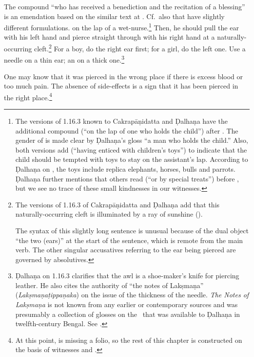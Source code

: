 \begin{translation}
{The compound  “who has received a benediction and
the recitation of a blessing” is an emendation based on the similar text at
.  Cf.\ also  that have slightly
different formulations.} on the lap of a wet-nurse.\footnote{The versions of
    1.16.3 known to Cakrapāṇidatta \citep[126]{acar-1939} and Ḍalhaṇa
    \citep[76]{vulgate} have the additional compound  (“on the
    lap of one who holds the child”) after . The gender of
     is made clear by  Ḍalhaṇa's gloss “a man who holds the child.”
    Also, both versions add  (“having enticed with
    children's toys”) to indicate that the child should be tempted with toys to stay
    on the assistant's lap. According to Ḍalhaṇa on , the toys include
    replica elephants, horses, bulls and parrots. Ḍalhaṇa further mentions that others
    read  (“or by special treats”) before
    , but we see no trace of these small kindnesses in our
    witnesses.} Then, he should pull the ear with his left hand 
    and pierce straight through with his right hand at a naturally-occurring
    cleft.\footnote{The versions of 1.16.3 of Cakrapāṇidatta \citep[126]{acar-1939}
        and Ḍalhaṇa \citep[76]{vulgate} add that this naturally-occurring cleft is
        illuminated by a ray of sunshine  ().

The syntax of this slightly long sentence is unusual because of the dual
object  “the two (ears)” at the start of the sentence, which is remote
from the main verb.  The other singular accusatives referring to the ear being
pierced are governed by absolutives.} For a boy, do the right ear first; for a
girl, do the left one. Use a needle on a thin ear; an  on a thick
one.\footnote{Ḍalhaṇa on 1.16.3 \citep[76]{vulgate} clarifies that the awl is a
    shoe-maker's knife for piercing leather.  He also cites the authority of “the
    notes of Lakṣmaṇa” (\emph{Lakṣmaṇaṭippaṇaka}) on the issue of the thickness of the
    needle. \textit{The Notes of Lakṣmaṇa} is not known from any earlier or
    contemporary sources and was presumably a collection of glosses on the \SS\ that
    was available to Ḍalhaṇa in twelfth-century Bengal. See \citet[IA,
    386]{meul-hist}.}
        
\item [3]  
    
One may know that it was pierced in the wrong place if there is excess blood or
too much pain. The absence of side-effects is a sign that it has been pierced in the right
place.\footnote{At this point,  is missing a folio, so
    the rest of this chapter is constructed on the basis of witnesses
     and .}
    

\end{translation}
